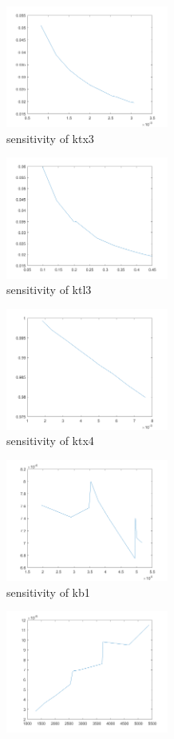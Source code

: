 \begin{figure}[H]
\begin{subfigure}{0.5\textwidth}
		\includegraphics[height=4cm]{tx3.png}
		\caption{sensitivity of ktx3}
	\end{subfigure}%
	\begin{subfigure}{0.5\textwidth}
		\includegraphics[height=4cm]{tl3.png}
		\caption{sensitivity of ktl3}
	\end{subfigure}
	\begin{subfigure}{0.5\textwidth}
		\includegraphics[height=4cm]{tx4.png}
		\caption{sensitivity of ktx4}
	\end{subfigure}%
	\begin{subfigure}{0.5\textwidth}
		\includegraphics[height=4cm]{b1.png}
		\caption{sensitivity of kb1}
	\end{subfigure}
	\begin{subfigure}{0.5\textwidth}
		\includegraphics[height=4cm]{b2.png}

\end{subfigure}
\end{figure}
